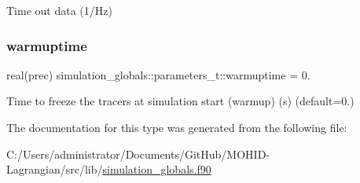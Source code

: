 Time out data (1/\+Hz) 

\mbox{\label{structsimulation__globals_1_1parameters__t_ad187b9779c3a5c156824c359eef4c52e}} 
\subsubsection{\texorpdfstring{warmuptime}{warmuptime}}
{\footnotesize\ttfamily real(prec) simulation\+\_\+globals\+::parameters\+\_\+t\+::warmuptime = 0.\hspace{0.3cm}{\ttfamily [private]}}



Time to freeze the tracers at simulation start (warmup) (s) (default=0.) 



The documentation for this type was generated from the following file\+:\begin{DoxyCompactItemize}
\item 
C\+:/\+Users/administrator/\+Documents/\+Git\+Hub/\+M\+O\+H\+I\+D-\/\+Lagrangian/src/lib/\mbox{\hyperlink{simulation__globals_8f90}{simulation\+\_\+globals.\+f90}}\end{DoxyCompactItemize}
